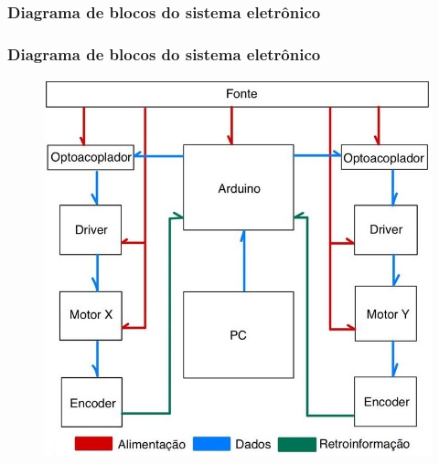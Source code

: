 \subsubsection{Diagrama de blocos do sistema eletrônico}

\begin{frame}
\frametitle{Diagrama de blocos do sistema eletrônico}

\begin{figure}
\centering
\includegraphics[scale = 0.4]{figs/fluxogramaeletronico}
\end{figure}
    
\end{frame}
